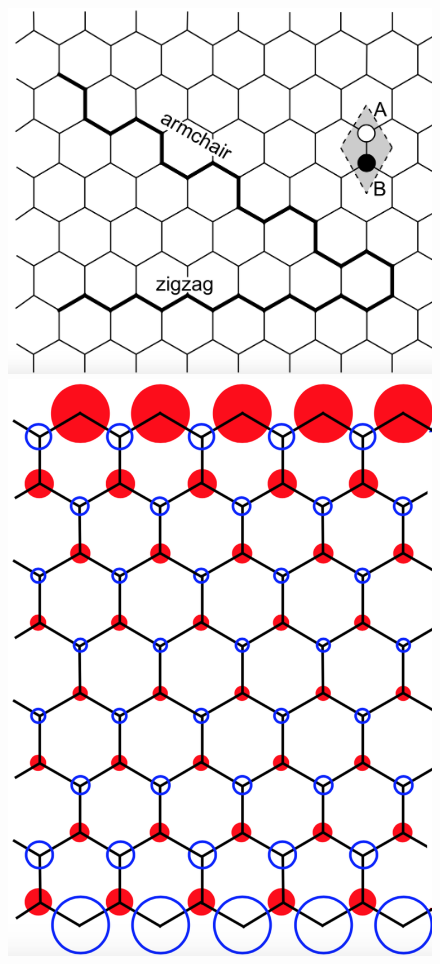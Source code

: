 \documentclass[10pt, twocolumn, twoside]{article}
\begin{document}
\begin{figure}[ht!]
\begin{minipage}[c]{0.1\textwidth}
\centering
\includegraphics[scale = 0.17]{zigzag}
\end{minipage} \hspace{3cm}
\begin{minipage}[c]{0.1\textwidth}
\includegraphics[scale = 0.18]{edge_states}

\end{minipage}
\end{figure}
\end{document}
